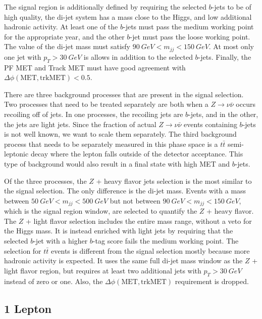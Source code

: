 The signal region is additionally defined by requiring
the selected $b$-jets to be of high quality,
the di-jet system has a mass close to the Higgs,
and low additional hadronic activity.
At least one of the $b$-jets must pass the medium working point for the appropriate year,
and the other $b$-jet must pass the loose working point.
The value of the di-jet mass must satisfy $\SI{90}{GeV} < m_{jj} < \SI{150}{GeV}$.
At most only one jet with $p_T > \SI{30}{GeV}$ is allows in addition to the selected $b$-jets.
Finally, the PF MET and Track MET must have good agreement with
$\Delta \phi(\mathrm{MET}, \mathrm{trkMET}) < 0.5$.

There are three background processes that are present in the signal selection.
Two processes that need to be treated separately are both when a $Z \rightarrow \nu\bar{\nu}$
occurs recoiling off of jets.
In one processes, the recoiling jets are $b$-jets,
and in the other, the jets are light jets.
Since the fraction of actual $Z \rightarrow \nu\bar{\nu}$ events
containing $b$-jets is not well known, we want to scale them separately.
The third background process that needs to be separately measured in this phase space
is a $t\bar{t}$ semi-leptonic decay where the lepton falls outside of the detector acceptance.
This type of background would also result in a final state with high MET and $b$-jets.

Of the three processes,
the $Z$ + heavy flavor jets selection is the most similar to the signal selection.
The only difference is the di-jet mass.
Events with a mass between $\SI{50}{GeV} < m_{jj} < \SI{500}{GeV}$ but not between
$\SI{90}{GeV} < m_{jj} < \SI{150}{GeV}$, which is the signal region window,
are selected to quantify the $Z$ + heavy flavor.
The $Z$ + light flavor selection includes the entire mass range,
without a veto for the Higgs mass.
It is instead enriched with light jets by requiring that the selected $b$-jet with
a higher $b$-tag score fails the medium working point.
The selection for $t\bar{t}$ events is different from the signal selection
mostly because more hadronic activity is expected.
It uses the same full di-jet mass window as the $Z$ + light flavor region,
but requires at least two additional jets with $p_T > \SI{30}{GeV}$ instead of zero or one.
Also, the $\Delta \phi(\mathrm{MET}, \mathrm{trkMET})$ requirement is dropped.

\subsection{1 Lepton} \label{sec:resolved-1}

